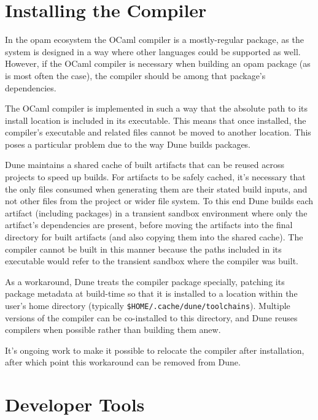 \documentclass{article}
\begin{document}
\begin{multicols}{2}
        \section {Installing the Compiler}

        In the opam ecosystem the OCaml compiler is a mostly-regular package,
        as the system is designed in a way where other languages could be
        supported as well. However, if the OCaml compiler is necessary when
        building an opam package (as is most often the case), the compiler should be
        among that package's dependencies.

        The OCaml compiler is implemented in such a way that the absolute path
        to its install location is included in its executable. This means that
        once installed, the compiler's executable and related files cannot be
        moved to another location. This poses a particular problem due to the
        way Dune builds packages.

        Dune maintains a shared cache of built artifacts that can be reused
        across projects to speed up builds. For artifacts to be safely cached,
        it's necessary that the only files consumed when generating them are
        their stated build inputs, and not other files from the project or wider
        file system. To this end Dune builds each artifact (including packages)
        in a transient sandbox environment where only the artifact's
        dependencies are present, before moving the artifacts into the final
        directory for built artifacts (and also copying them into the shared
        cache). The compiler cannot be built in this manner because the paths
        included in its executable would refer to the transient sandbox where
        the compiler was built.

        As a workaround, Dune treats the compiler package specially, patching
        its package metadata at build-time so that it is installed to a location
        within the user's home directory (typically
        \texttt{\$HOME/.cache/dune/toolchains}). Multiple versions of the
        compiler can be co-installed to this directory, and Dune reuses
        compilers when possible rather than building them anew.

        It's ongoing work to make it possible to relocate the compiler after
        installation, after which point this workaround can be removed from
        Dune.

        \section {Developer Tools}


\end{multicols}
\end{document}
